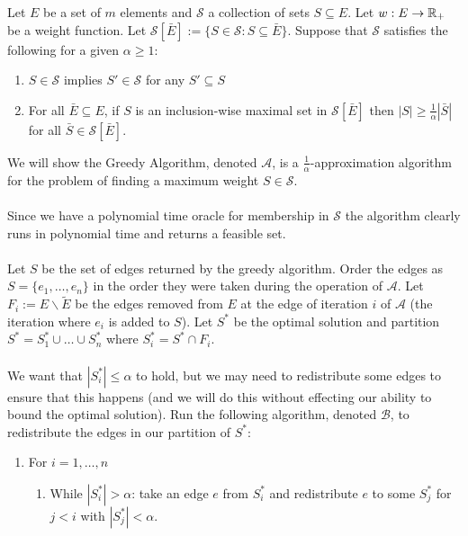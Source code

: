 \documentclass[letterpaper,12pt,oneside,onecolumn]{article}
\newcommand{\cA}{\mathcal{A}} \newcommand{\cB}{\mathcal{B}}
\newcommand{\cS}{\mathcal{S}} \newcommand{\cT}{\mathcal{T}}
\begin{document}
\section{}
\paragraph{}
Let $E$ be a set of $m$ elements and $\cS$ a collection of sets $S \subseteq E$. Let $w: E\rightarrow \mathbb{R}_+$ be a weight function. Let $\cS[\bar{E}] := \{ S \in \cS : S \subseteq \bar{E}\}$. Suppose that $\cS$ satisfies the following for a given $\alpha \geq 1$:
\begin{enumerate}
\item $S \in \cS$ implies $S' \in \cS$ for any $S' \subseteq S$
\item For all $\bar{E} \subseteq E$, if $S$ is an inclusion-wise maximal set in $\cS[\bar{E}]$ then $|S| \geq \frac{1}{\alpha} |\bar{S}|$ for all $\bar{S} \in \cS[\bar{E}]$.
\end{enumerate}
We will show the Greedy Algorithm, denoted $\cA$, is a $\frac{1}{\alpha}$-approximation algorithm for the problem of finding a maximum weight $S \in \cS$.
\paragraph{}
Since we have a polynomial time oracle for membership in $\cS$ the algorithm clearly runs in polynomial time and returns a feasible set.
\paragraph{}
Let $S$ be the set of edges returned by the greedy algorithm. Order the edges as $S = \{e_1, \dots, e_n\}$ in the order they were taken during the operation of $\cA$. Let $F_i := E\backslash \tilde{E}$ be the edges removed from $E$ at the edge of iteration $i$ of $\cA$ (the iteration where $e_i$ is added to $S$). Let $S^*$ be the optimal solution and partition $S^* = S^*_1 \cup \dots \cup S^*_n$ where $S^*_i = S^* \cap F_i$.
\paragraph{}
We want that $|S^*_i| \leq \alpha$ to hold, but we may need to redistribute some edges to ensure that this happens (and we will do this without effecting our ability to bound the optimal solution). Run the following algorithm, denoted $\cB$, to redistribute the edges in our partition of $S^*$:
\begin{enumerate}
\item For $i = 1, \dots, n$
\begin{enumerate}
\item While $|S^*_i| > \alpha$: take an edge $e$ from $S^*_i$ and redistribute $e$ to some $S^*_j$ for $j<i$ with $|S^*_j| < \alpha$.
\end{enumerate}
\end{enumerate}
\end{document}
